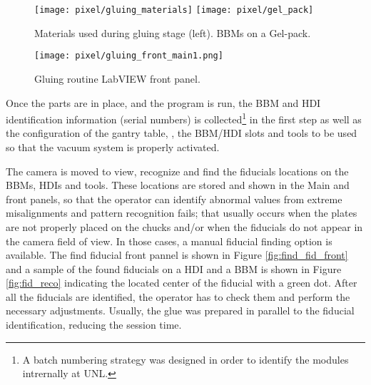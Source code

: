 \begin{figure}[h]
\begin{center}
  \texttt{[image: pixel/gluing\_materials]}
  \texttt{[image: pixel/gel\_pack]}
 \caption[Materials used during gluing stage]{Materials used during gluing stage (left). BBMs on a Gel-pack.}\label{fig:gluing_materials}
\end{center}
\end{figure}

\begin{landscape}
\begin{figure}[h]
  \begin{center}
    \vspace{-2.5cm}
    \hspace{-1cm}
    \texttt{[image: pixel/gluing\_front\_main1.png]}
    \caption[Gluing routine LabVIEW front panel]{Gluing routine LabVIEW front panel.}\label{fig:gluing_front_main}
    \vspace{-2cm}
    \hspace{-2cm}
  \end{center}
\end{figure}
\end{landscape}


Once the parts are in place, and the program is run, the BBM and HDI identification information (serial numbers) is collected\footnote{A batch numbering strategy was designed in order to identify the modules intrernally at UNL.} in the first step as well as the configuration of the gantry table, \ie, the BBM/HDI slots and tools to be used so that the vacuum system is properly activated. 

The camera is moved to view, recognize and find the fiducials locations on the BBMs, HDIs and tools. These locations are stored and shown in the Main and  front panels, so that the operator can identify abnormal values from extreme misalignments and pattern recognition fails; that usually occurs when the plates are not properly placed on the chucks and/or when the fiducials do not appear in the camera field of view. In those cases, a manual fiducial finding option is available. The find fiducial front pannel is shown in Figure \ref{fig:find_fid_front} and a sample of the found fiducials on a HDI and a BBM is shown in Figure \ref{fig:fid_reco} indicating the located center of the fiducial with a green dot. After all the fiducials are identified, the operator has to check them and perform the necessary adjustments. Usually, the glue was prepared in parallel to the fiducial identification, reducing the session time.  

